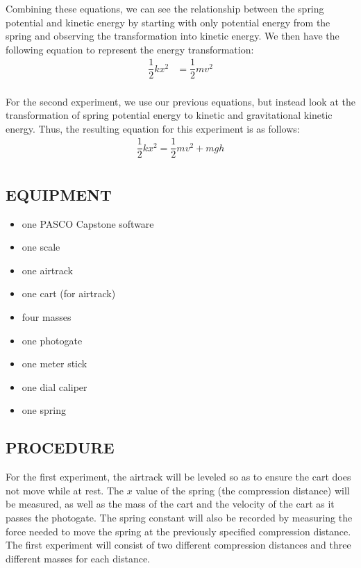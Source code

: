 \documentclass [12pt, letterpaper, twoside] {article}
\begin{document}
\noindent
Combining these equations, we can see the relationship between the spring potential and kinetic energy by starting with only potential energy from the spring and observing the transformation into kinetic energy. We then have the following equation to represent the energy transformation:
\begin {equation}
  \begin {split}
    \dfrac{1}{2}kx^{2} & = \dfrac{1}{2}mv^{2} \\
  \end {split}
\end {equation}

\noindent
For the second experiment, we use our previous equations, but instead look at the transformation of spring potential energy to kinetic and gravitational kinetic energy. Thus, the resulting equation for this experiment is as follows:
\begin {equation}
  \begin {split}
    \dfrac{1}{2}kx^{2} = \dfrac{1}{2}mv^{2} + mgh \\
  \end {split}
\end {equation}
 

\subsection* {EQUIPMENT}
  \noindent
  \begin {itemize}
    \itemsep0em
    \item {one PASCO Capstone software}
    \item {one scale}
    \item {one airtrack}
    \item {one cart (for airtrack)}
    \item {four masses}
    \item {one photogate}
    \item {one meter stick}
    \item {one dial caliper}
    \item {one spring}
  \end {itemize}

\subsection* {PROCEDURE}
For the first experiment, the airtrack will be leveled so as to ensure the cart does not move while at rest. The \(x\) value of the spring (the compression distance) will be measured, as well as the mass of the cart and the velocity of the cart as it passes the photogate. The spring constant will also be recorded by measuring the force needed to move the spring at the previously specified compression distance. The first experiment will consist of two different compression distances and three different masses for each distance. \\
\end{document}
